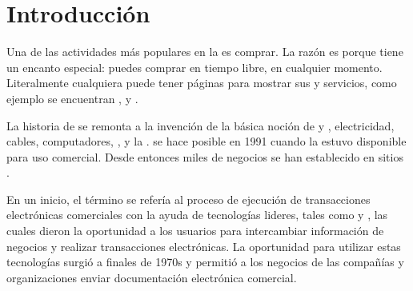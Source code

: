 \chapter{Introducción}\label{cap:intro}


Una de las actividades más populares en la \webINT es comprar. La razón es porque tiene un encanto especial: puedes comprar en tiempo libre, en cualquier momento. Literalmente cualquiera puede tener páginas para mostrar sus \itemsCOM y servicios, como ejemplo se encuentran \amazonNAME \cite{online_amazon_official}, \ebayNAME \cite{online_ebay_official} y \bestBuyNAME \cite{online_bestbuy_official}.

La historia de \ecommerceCOM se remonta a la invención de la básica noción de \buyingCOM y \sellingCOM, electricidad, cables, computadores, \modems, y la \internetINT. \ecommerceCOM se hace posible en 1991 cuando la \internetINT estuvo disponible para uso comercial. Desde entonces miles de negocios se han establecido en sitios \webINT.

En un inicio, el término \ecommerceCOM se refería al proceso de ejecución  de transacciones electrónicas comerciales con la ayuda de tecnologías lideres, tales como \electDataInterCOM y \electFundsTransCOM, las cuales dieron la oportunidad a los usuarios para intercambiar información de negocios y realizar transacciones electrónicas. La oportunidad para utilizar estas tecnologías surgió a finales de 1970s \cite{online_history_ecommerce} y permitió a los negocios de las compañías y organizaciones enviar documentación electrónica comercial.

